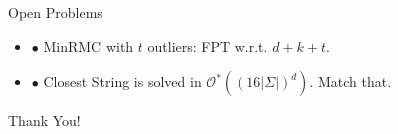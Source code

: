 \documentclass{beamer}
\renewcommand{\l}{\left}
\renewcommand{\r}{\right}
\begin{document}
\begin{frame}{Open Problems}
  \begin{itemize}
  \item $\bullet$ MinRMC with $t$ outliers: FPT w.r.t. $d + k + t$.
\vspace{2mm}
  \item $\bullet$ Closest String is solved in $\mathcal{O}^*\l(\l(16
    |\Sigma|\r)^d\r)$. Match that.
  \end{itemize}
  \vspace{4mm}
\begin{center} \Huge{Thank You!}
  \end{center}
\end{frame}
\end{document}
